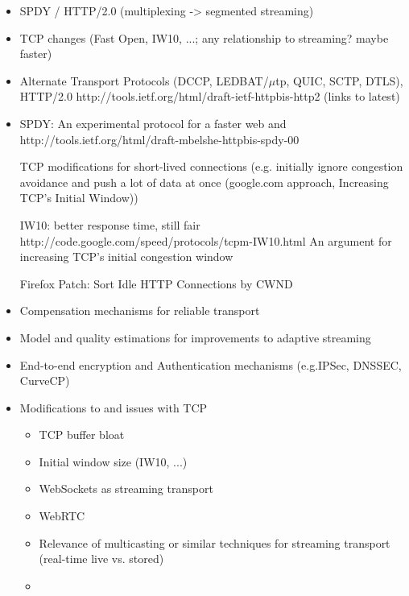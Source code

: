 \begin{itemize}
\item SPDY / \gls{HTTP}/2.0 (multiplexing -> segmented streaming)
\item \gls{TCP} changes (Fast Open, IW10, ...; any relationship to streaming? maybe faster)
\item Alternate Transport Protocols (DCCP\cite{rfc4340}, LEDBAT\cite{rfc6817}/$\mu$tp\cite{bt2010utp}, QUIC, SCTP, DTLS), 
HTTP/2.0 http://tools.ietf.org/html/draft-ietf-httpbis-http2 (links to latest)
\item SPDY: An experimental protocol for a faster web \cite{google2011SPDYdef} and \cite{google2010SPDYwp} http://tools.ietf.org/html/draft-mbelshe-httpbis-spdy-00

TCP modifications for short-lived connections (e.g. initially ignore congestion avoidance and push a lot of data at once (google.com approach, Increasing TCP's Initial Window)) 

IW10: better response time, still fair  http://code.google.com/speed/protocols/tcpm-IW10.html
An argument for increasing \gls{TCP}'s initial congestion window \cite{dukkipati2010argument}

Firefox Patch: Sort Idle HTTP Connections by CWND \cite{ffSortCWND}

\item Compensation mechanisms for reliable transport
\item Model and quality estimations for improvements to adaptive streaming
\item End-to-end encryption and Authentication mechanisms (e.g.IPSec, DNSSEC, CurveCP) %
\item Modifications to and issues with \gls{TCP}
 \begin{itemize}
 \item \gls{TCP} buffer bloat
 \item Initial window size (IW10, ...)
 \item WebSockets as streaming transport \cite{w3c2011websockets} \cite{heise2011websockets}
 \item WebRTC
 \item Relevance of multicasting or similar techniques for streaming transport (real-time live vs. stored)
 \item
 \end{itemize}
 \end{itemize}





